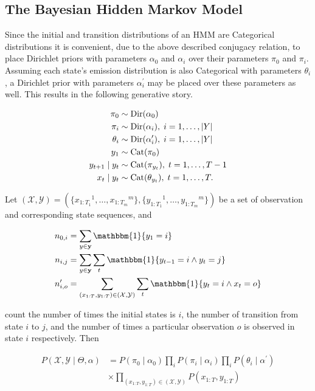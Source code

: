 \documentclass[12pt]{report}
\newcommand{\p}[0]{\prime}
\newcommand{\1}[0]{\mathbbm{1}}
\newcommand{\Cat}[0]{\textnormal{Cat}}
\newcommand{\Dir}[0]{\textnormal{Dir}}
\newcommand{\seq}[3]{\ensuremath{#1_{{#2}:{#3}}}}
\DeclarePairedDelimiter\abs{\lvert}{\rvert}%
\begin{document}
\subsection{The Bayesian Hidden Markov Model}
Since the initial and transition distributions of an \ac{HMM} are Categorical distributions
it is convenient, due to the above described conjugacy relation, to place Dirichlet priors
with parameters $\alpha_0$ and $\alpha_i$ over their parameters $\pi_0$ and $\pi_i$.
Assuming each state's emission distribution is also Categorical
with parameters $\theta_i$, a Dirichlet prior with parameters $\alpha_i^\p$ may be placed
over these parameters as well. This results in the following generative story.

\begin{align*}
    \pi_0 & \sim \Dir(\alpha_0) \\
    \pi_i & \sim \Dir(\alpha_i),\; i = 1, \ldots, \abs{Y} \\
    \theta_i & \sim \Dir(\alpha_i^\p),\; i = 1, \ldots, \abs{Y} \\
    y_1 & \sim \Cat(\pi_0) \\
    y_{t+1} \mid y_t & \sim \Cat(\pi_{y_t}),\; t = 1, \ldots, T-1 \\
    x_t \mid y_t & \sim \Cat(\theta_{y_t}), \; t = 1, \ldots, T.
\end{align*}

Let $(\mathcal{X}, \mathcal{Y}) = (\{\seq{x}{1}{T_1}^1, \ldots, \seq{x}{1}{T_m}^m\},
\{\seq{y}{1}{T_1}^1, \ldots, \seq{y}{1}{T_m}^m\})$ be a set of
observation and corresponding state sequences, and

\begin{align*}
    n_{0, i} &= \sum_{y \in \mathbf{y}} \1\{y_1 = i\} \\
    n_{i, j} &= \sum_{y \in \mathbf{y}} \sum_{t} \1\{y_{t-1} = i \wedge y_t = j\} \\
    n_{i, o}^\p &= \sum_{(\seq{x}{1}{T},\seq{y}{1}{T}) \in (\mathcal{X},\mathcal{Y})} \sum_{t} \1\{y_t = i \wedge x_t = o\} \\
\end{align*}

count the number of times the initial states is $i$, the number of transition from state $i$ to $j$,
and the number of times a particular observation $o$ is observed in state $i$ respectively. Then

\begin{align}  \label{eq:bayes-hmm-joint-simple}
 P(\mathcal{X}, \mathcal{Y} \mid \Theta, \alpha)
 &=  P(\pi_0 \mid \alpha_0) \prod_i P(\pi_i \mid \alpha_i) \prod_i P(\theta_i \mid \alpha^\prime) \nonumber\\
 & \times \prod_{(\seq{x}{1}{T},\seq{y}{1}{T}) \in (\mathcal{X},\mathcal{Y})} P(\seq{x}{1}{T},\seq{y}{1}{T})
\end{align}
\end{document}
